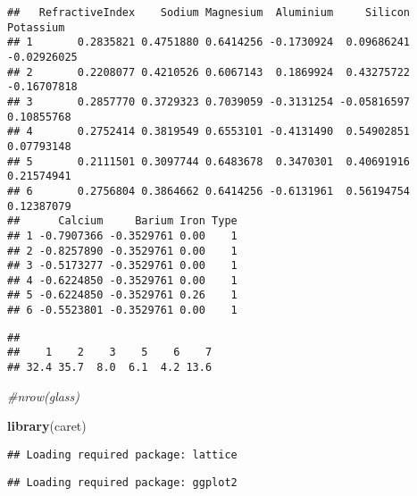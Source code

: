 \documentclass[]{article}
\newenvironment{Shaded}{\begin{snugshade}}{\end{snugshade}}
\newcommand{\KeywordTok}[1]{\textcolor[rgb]{0.13,0.29,0.53}{\textbf{#1}}}
\newcommand{\DataTypeTok}[1]{\textcolor[rgb]{0.13,0.29,0.53}{#1}}
\newcommand{\DecValTok}[1]{\textcolor[rgb]{0.00,0.00,0.81}{#1}}
\newcommand{\StringTok}[1]{\textcolor[rgb]{0.31,0.60,0.02}{#1}}
\newcommand{\CommentTok}[1]{\textcolor[rgb]{0.56,0.35,0.01}{\textit{#1}}}
\newcommand{\OperatorTok}[1]{\textcolor[rgb]{0.81,0.36,0.00}{\textbf{#1}}}
\newcommand{\NormalTok}[1]{#1}
\begin{document}
\begin{verbatim}
##   RefractiveIndex    Sodium Magnesium  Aluminium     Silicon   Potassium
## 1       0.2835821 0.4751880 0.6414256 -0.1730924  0.09686241 -0.02926025
## 2       0.2208077 0.4210526 0.6067143  0.1869924  0.43275722 -0.16707818
## 3       0.2857770 0.3729323 0.7039059 -0.3131254 -0.05816597  0.10855768
## 4       0.2752414 0.3819549 0.6553101 -0.4131490  0.54902851  0.07793148
## 5       0.2111501 0.3097744 0.6483678  0.3470301  0.40691916  0.21574941
## 6       0.2756804 0.3864662 0.6414256 -0.6131961  0.56194754  0.12387079
##      Calcium     Barium Iron Type
## 1 -0.7907366 -0.3529761 0.00    1
## 2 -0.8257890 -0.3529761 0.00    1
## 3 -0.5173277 -0.3529761 0.00    1
## 4 -0.6224850 -0.3529761 0.00    1
## 5 -0.6224850 -0.3529761 0.26    1
## 6 -0.5523801 -0.3529761 0.00    1
\end{verbatim}

\begin{Shaded}
\end{Shaded}

\begin{verbatim}
## 
##    1    2    3    5    6    7 
## 32.4 35.7  8.0  6.1  4.2 13.6
\end{verbatim}

\begin{Shaded}
\begin{Highlighting}[]
\CommentTok{#nrow(glass)}

\KeywordTok{library}\NormalTok{(caret)}
\end{Highlighting}
\end{Shaded}

\begin{verbatim}
## Loading required package: lattice
\end{verbatim}

\begin{verbatim}
## Loading required package: ggplot2
\end{verbatim}
\end{document}
